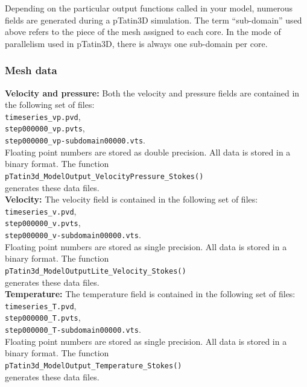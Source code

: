 \documentclass[paper=a4, fontsize=11pt,twoside]{scrartcl}
\newcommand{\ptat}{{{\sc pTatin3D}}}
\newcommand{\unix}[1]{\texttt{\footnotesize #1}}
\begin{document}
{{Depending on the particular output functions called in your model, numerous fields are generated during a {\ptat} simulation.
The term ``sub-domain'' used above refers to the piece of the mesh assigned to each core. In the mode of parallelism used in {\ptat}, there is always one sub-domain per core.

\subsubsection{Mesh data}
{\bf Velocity and pressure:} Both the velocity and pressure fields are contained in the following set of files: \\
\unix{timeseries\_vp.pvd}, \\
\unix{step000000\_vp.pvts}, \\
\unix{step000000\_vp-subdomain00000.vts}.\\
Floating point numbers are stored as double precision. All data is stored in a binary format. The function \\
\unix{pTatin3d\_ModelOutput\_VelocityPressure\_Stokes()} \\
generates these data files.
\\[8pt]
{\bf Velocity:} The velocity field is contained in the following set of files: \\
\unix{timeseries\_v.pvd}, \\
\unix{step000000\_v.pvts}, \\
\unix{step000000\_v-subdomain00000.vts}. \\
Floating point numbers are stored as single precision. All data is stored in a binary format.
The function \\
\unix{pTatin3d\_ModelOutputLite\_Velocity\_Stokes()} \\
generates these data files.
\\[8pt]
{\bf Temperature:} The temperature field is contained in the following set of files: \\
\unix{timeseries\_T.pvd}, \\
\unix{step000000\_T.pvts}, \\
\unix{step000000\_T-subdomain00000.vts}.\\
Floating point numbers are stored as single precision. All data is stored in a binary format.
The function \\
\unix{pTatin3d\_ModelOutput\_Temperature\_Stokes()} \\
generates these data files.


}}
\end{document}
